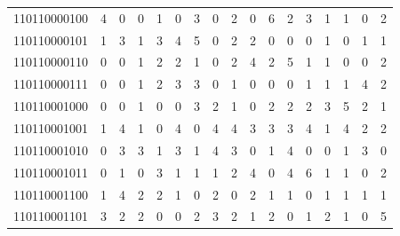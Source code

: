 \documentclass[10pt,a4paper]{article}
\begin{document}
\begin{longtable}{ |c|c|c|c|c|c|c|c|c|c|c|c|c|c|c|c|c| }
    110110000100              & 4                            & 0                                & 0                            & 1                              & 0   & 3   & 0   & 2   & 0   & 6   & 2   & 3   & 1   & 1   & 0   & 2   \\
    110110000101              & 1                            & 3                                & 1                            & 3                              & 4   & 5   & 0   & 2   & 2   & 0   & 0   & 0   & 1   & 0   & 1   & 1   \\
    110110000110              & 0                            & 0                                & 1                            & 2                              & 2   & 1   & 0   & 2   & 4   & 2   & 5   & 1   & 1   & 0   & 0   & 2   \\
    110110000111              & 0                            & 0                                & 1                            & 2                              & 3   & 3   & 0   & 1   & 0   & 0   & 0   & 1   & 1   & 1   & 4   & 2   \\
    110110001000              & 0                            & 0                                & 1                            & 0                              & 0   & 3   & 2   & 1   & 0   & 2   & 2   & 2   & 3   & 5   & 2   & 1   \\
    110110001001              & 1                            & 4                                & 1                            & 0                              & 4   & 0   & 4   & 4   & 3   & 3   & 3   & 4   & 1   & 4   & 2   & 2   \\
    110110001010              & 0                            & 3                                & 3                            & 1                              & 3   & 1   & 4   & 3   & 0   & 1   & 4   & 0   & 0   & 1   & 3   & 0   \\
    110110001011              & 0                            & 1                                & 0                            & 3                              & 1   & 1   & 1   & 2   & 4   & 0   & 4   & 6   & 1   & 1   & 0   & 2   \\
    110110001100              & 1                            & 4                                & 2                            & 2                              & 1   & 0   & 2   & 0   & 2   & 1   & 1   & 0   & 1   & 1   & 1   & 1   \\
    110110001101              & 3                            & 2                                & 2                            & 0                              & 0   & 2   & 3   & 2   & 1   & 2   & 0   & 1   & 2   & 1   & 0   & 5   \\

\end{longtable}
\end{document}
